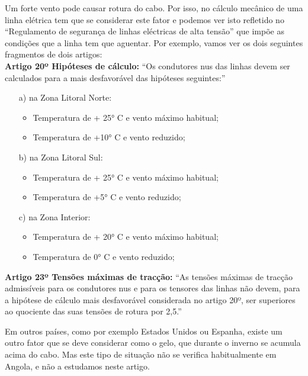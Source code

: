 Um forte vento pode causar rotura do cabo. Por isso, no cálculo
mecânico de uma linha elétrica tem que se considerar este fator e
podemos ver isto refletido no ``Regulamento de segurança de linhas
eléctricas de alta tensão'' que impõe as condições que a linha tem 
que aguentar. Por exemplo, vamos ver os dois seguintes fragmentos de dois 
artigos:\\
{\bf Artigo 20º Hipóteses de cálculo:} ``Os condutores nus das linhas
devem ser calculados para a mais desfavorável das hipóteses
seguintes:''
\begin{itemize}[noitemsep,nolistsep]
\item[a)] na Zona Litoral Norte:
  \begin{itemize}[noitemsep,nolistsep]
  \item Temperatura de + 25° C e vento máximo habitual;
  \item Temperatura de +10° C e vento reduzido; 
  \end{itemize}
\item[b)] na Zona Litoral Sul:
  \begin{itemize}[noitemsep,nolistsep]
  \item Temperatura de + 25° C e vento máximo habitual;
  \item Temperatura de +5° C e vento reduzido; 
  \end{itemize}
\item[c)] na Zona Interior:
  \begin{itemize}[noitemsep,nolistsep]
  \item Temperatura de + 20° C e vento máximo habitual;
  \item Temperatura de 0° C e vento reduzido; 
  \end{itemize}
\end{itemize}
{\bf Artigo 23º Tensões máximas de tracção:} ``As tensões máximas de
tracção admissíveis para os condutores nus e para os tensores das
linhas não devem, para a hipótese de cálculo mais desfavorável
considerada no artigo 20º, ser superiores ao quociente das suas
tensões de rotura por 2,5.''


Em outros países, como por exemplo Estados Unidos ou Espanha, existe um outro fator que se deve considerar como o gelo, que durante o inverno se acumula acima do cabo. Mas este tipo de situação não se verifica habitualmente em Angola, e não a estudamos neste artigo.
